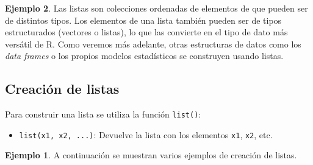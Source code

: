 \documentclass[
]{book}
\newenvironment{Shaded}{\begin{snugshade}}{\end{snugshade}}
\newcommand{\CommentTok}[1]{\textcolor[rgb]{0.56,0.35,0.01}{\textit{#1}}}
\newcommand{\ConstantTok}[1]{\textcolor[rgb]{0.00,0.00,0.00}{#1}}
\newcommand{\DecValTok}[1]{\textcolor[rgb]{0.00,0.00,0.81}{#1}}
\newcommand{\FunctionTok}[1]{\textcolor[rgb]{0.00,0.00,0.00}{#1}}
\newcommand{\NormalTok}[1]{#1}
\newcommand{\OtherTok}[1]{\textcolor[rgb]{0.56,0.35,0.01}{#1}}
\newcommand{\StringTok}[1]{\textcolor[rgb]{0.31,0.60,0.02}{#1}}
\providecommand{\tightlist}{%
  \setlength{\itemsep}{0pt}\setlength{\parskip}{0pt}}
\theoremstyle{definition}
\theoremstyle{definition}
\newtheorem{example}{Ejemplo}[chapter]
\theoremstyle{definition}
\theoremstyle{definition}
\theoremstyle{remark}
\begin{document}
\begin{example}
Las listas son colecciones ordenadas de elementos de que pueden ser de distintos tipos. Los elementos de una lista también pueden ser de tipos estructurados (vectores o listas), lo que las convierte en el tipo de dato más versátil de R. Como veremos más adelante, otras estructuras de datos como los \emph{data frames} o los propios modelos estadísticos se construyen usando listas.

\hypertarget{creaciuxf3n-de-listas}{%
\subsection{Creación de listas}\label{creaciuxf3n-de-listas}}

Para construir una lista se utiliza la función \texttt{list()}:

\begin{itemize}
\tightlist
\item
  \texttt{list(x1,\ x2,\ ...)}: Devuelve la lista con los elementos \texttt{x1}, \texttt{x2}, etc.
\end{itemize}

\begin{example}

A continuación se muestran varios ejemplos de creación de listas.

\begin{Shaded}
\end{Shaded}


\end{example}
\end{example}
\end{document}
